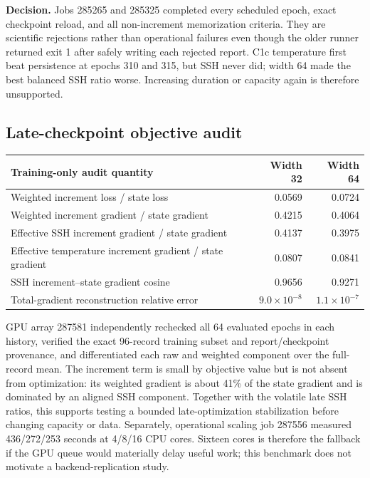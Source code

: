 \documentclass[11pt]{article}
\begin{document}
\textbf{Decision.}  Jobs 285265 and 285325 completed every scheduled epoch, exact
checkpoint reload, and all non-increment memorization criteria.  They are scientific
rejections rather than operational failures even though the older runner returned
exit 1 after safely writing each rejected report.  C1c temperature first beat
persistence at epochs 310 and 315, but SSH never did; width 64 made the best balanced
SSH ratio worse.  Increasing duration or capacity again is therefore unsupported.

\subsection{Late-checkpoint objective audit}

\begin{center}\small
\begin{tabular}{@{}lrr@{}}
\toprule
\textbf{Training-only audit quantity} & \textbf{Width 32} & \textbf{Width 64} \\
\midrule
Weighted increment loss / state loss & 0.0569 & 0.0724 \\
Weighted increment gradient / state gradient & 0.4215 & 0.4064 \\
Effective SSH increment gradient / state gradient & 0.4137 & 0.3975 \\
Effective temperature increment gradient / state gradient & 0.0807 & 0.0841 \\
SSH increment--state gradient cosine & 0.9656 & 0.9271 \\
Total-gradient reconstruction relative error & \(9.0\times10^{-8}\) &
\(1.1\times10^{-7}\) \\
\bottomrule
\end{tabular}
\end{center}

GPU array 287581 independently rechecked all 64 evaluated epochs in each history,
verified the exact 96-record training subset and report/checkpoint provenance, and
differentiated each raw and weighted component over the full-record mean.  The
increment term is small by objective value but is not absent from optimization: its
weighted gradient is about 41\% of the state gradient and is dominated by an aligned
SSH component.  Together with the volatile late SSH ratios, this supports testing a
bounded late-optimization stabilization before changing capacity or data.  Separately,
operational scaling job 287556 measured 436/272/253 seconds at 4/8/16 CPU cores.
Sixteen cores is therefore the fallback if the GPU queue would materially delay useful
work; this benchmark does not motivate a backend-replication study.
\end{document}
